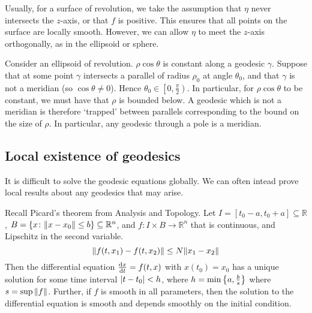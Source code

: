 \begin{example}
	Usually, for a surface of revolution, we take the assumption that \( \eta \) never intersects the \( z \)-axis, or that \( f \) is positive.
	This ensures that all points on the surface are locally smooth.
	However, we can allow \( \eta \) to meet the \( z \)-axis orthogonally, as in the ellipsoid or sphere.

	Consider an ellipsoid of revolution.
	\( \rho \cos \theta \) is constant along a geodesic \( \gamma \).
	Suppose that at some point \( \gamma \) intersects a parallel of radius \( \rho_0 \) at angle \( \theta_0 \), and that \( \gamma \) is not a meridian (so \( \cos \theta \neq 0 \)).
	Hence \( \theta_0 \in \left[0, \frac{\pi}{2}\right) \).
	In particular, for \( \rho \cos \theta \) to be constant, we must have that \( \rho \) is bounded below.
	A geodesic which is not a meridian is therefore `trapped' between parallels corresponding to the bound on the size of \( \rho \).
	In particular, any geodesic through a pole is a meridian.
\end{example}

\subsection{Local existence of geodesics}
It is difficult to solve the geodesic equations globally.
We can often intead prove local results about any geodesics that may arise.

Recall Picard's theorem from Analysis and Topology.
Let \( I = [t_0 - a, t_0 + a] \subseteq \mathbb R \), \( B = \qty{x \colon \norm{x-x_0} \leq b} \subseteq \mathbb R^n \), and \( f \colon I \times B \to \mathbb R^n \) that is continuous, and Lipschitz in the second variable.
\[
	\norm{f(t,x_1) - f(t,x_2)} \leq N \norm{x_1-x_2}
\]
Then the differential equation \( \dv{x}{t} = f(t,x) \) with \( x(t_0) = x_0 \) has a unique solution for some time interval \( \abs{t-t_0} < h \), where \( h = \min\qty{a,\frac{b}{s}} \) where \( s = \sup \norm{f} \).
Further, if \( f \) is smooth in all parameters, then the solution to the differential equation is smooth and depends smoothly on the initial condition.

